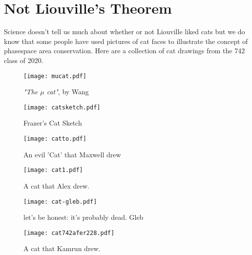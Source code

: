 \section{Not Liouville's Theorem}
Science doesn't tell us much about whether or not Liouville liked cats but we do know that some people have used pictures of cat faces to illustrate the concept of phasespace area conservation. 
Here are a collection of cat drawings from the 742 class of 2020.

\begin{centering}
\begin{figure}\centering
	\texttt{[image: mucat.pdf]}
  \caption{\textsl{"The $\mu$ cat"}, by Wang}
  \label{fig:cat1}
\end{figure}

\begin{figure}
	\texttt{[image: catsketch.pdf]}
  \caption{Frazer's Cat Sketch}
  \label{fig:catsketch}
\end{figure}

\begin{figure}
	\texttt{[image: catto.pdf]}
  \caption{An evil 'Cat' that Maxwell drew}
  \label{fig:catto}
\end{figure}
\end{centering}

\begin{centering}
\begin{figure}
	\texttt{[image: cat1.pdf]}
  \caption{A cat that Alex drew.}
  \label{fig:cat1}
\end{figure}
\end{centering}

\begin{centering}
\begin{figure}
	\texttt{[image: cat-gleb.pdf]}
  \caption{let's be honest: it's probably dead. Gleb }
  \label{fig:cat1}
\end{figure}
\end{centering}

\begin{centering}
\begin{figure}
	\texttt{[image: cat742afer228.pdf]}
  \caption{A cat that Kamrun drew.}
  \label{Cat draw by Kamrun}
\end{figure}
\end{centering}

\clearpage
